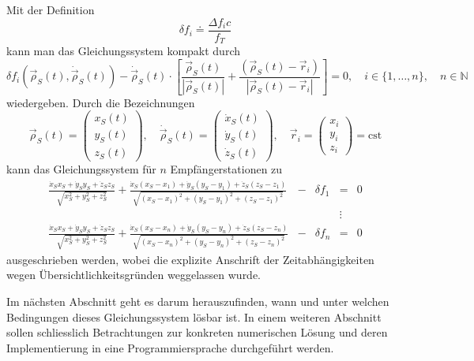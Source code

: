\documentclass[a4paper,12pt]{article}
\numberwithin{equation}{section}
\begin{document}
Mit der Definition \begin{equation}
\delta f_i \doteq \frac{\Delta f_i c}{f_T}
\end{equation} kann man das Gleichungssystem kompakt durch \begin{equation}\label{eq:GlSystMethodToSolveWithoutApprox}
\delta f_i(\vec{\rho}_S(t),\dot{\vec{\rho}}_S(t)) - \dot{\vec{\rho}}_S(t)\cdot \left[\frac{\vec{\rho}_S(t)}{|\vec{\rho}_S(t)|}+\frac{(\vec{\rho}_S(t)-\vec{r}_i)}{|\vec{\rho}_S(t)-\vec{r}_i|}\right] = 0,\quad  i \in \{1,\dots,n\}, \quad  n \in \mathbb{N}
\end{equation} wiedergeben. Durch die Bezeichnungen \begin{equation}
\vec{\rho}_{S}(t) = \begin{pmatrix}
x_S(t) \\ y_S(t) \\ z_S(t)
\end{pmatrix}, \quad \dot{\vec{\rho}}_S(t) = \begin{pmatrix}
\dot{x}_S(t) \\ \dot{y}_S(t) \\ \dot{z}_S(t)
\end{pmatrix}, \quad \vec{r}_i = \begin{pmatrix}
x_i \\ y_i \\ z_i
\end{pmatrix} = \textrm{cst}
\end{equation} kann das Gleichungssystem für $n$ Empfängerstationen zu \begin{equation}\label{eq:ShamesGlSystWithoutApprox}
\begin{matrix}
\frac{\dot{x}_Sx_S+\dot{y}_Sy_S+\dot{z}_Sz_S}{\sqrt{x_S^2 + y_S^2+z_S^2}}+\frac{\dot{x}_S(x_S-x_1)+\dot{y}_S(y_S-y_1)+\dot{z}_S(z_S-z_1)}{\sqrt{(x_S-x_1)^2 + (y_S-y_1)^2+(z_S-z_1)^2}} & - & \delta f_1 & = & 0 \\
 &  &  & \vdots &  \\
\frac{\dot{x}_Sx_S+\dot{y}_Sy_S+\dot{z}_Sz_S}{\sqrt{x_S^2 + y_S^2+z_S^2}}+\frac{\dot{x}_S(x_S-x_n)+\dot{y}_S(y_S-y_n)+\dot{z}_S(z_S-z_n)}{\sqrt{(x_S-x_n)^2 + (y_S-y_n)^2+(z_S-z_n)^2}}&- &\delta f_n &= &0
\end{matrix}
\end{equation} ausgeschrieben werden, wobei die explizite Anschrift der Zeitabhängigkeiten wegen Übersichtlichkeitsgründen weggelassen wurde.

Im nächsten Abschnitt geht es darum herauszufinden, wann und unter welchen Bedingungen dieses Gleichungssystem lösbar ist. In einem weiteren Abschnitt sollen schliesslich Betrachtungen zur konkreten numerischen Lösung und deren Implementierung in eine Programmiersprache durchgeführt werden.
\end{document}
